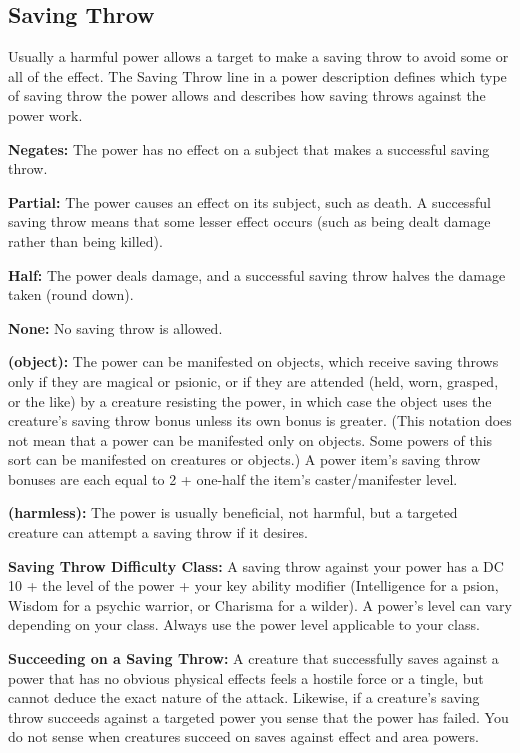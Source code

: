 \subsection{Saving Throw}
Usually a harmful power allows a target to make a saving throw to avoid some or all of the effect. The Saving Throw line in a power description defines which type of saving throw the power allows and describes how saving throws against the power work.

\textbf{Negates:} The power has no effect on a subject that makes a successful saving throw.

\textbf{Partial:} The power causes an effect on its subject, such as death. A successful saving throw means that some lesser effect occurs (such as being dealt damage rather than being killed).

\textbf{Half:} The power deals damage, and a successful saving throw halves the damage taken (round down).

\textbf{None:} No saving throw is allowed.

\textbf{(object):} The power can be manifested on objects, which receive saving throws only if they are magical or psionic, or if they are attended (held, worn, grasped, or the like) by a creature resisting the power, in which case the object uses the creature's saving throw bonus unless its own bonus is greater. (This notation does not mean that a power can be manifested only on objects. Some powers of this sort can be manifested on creatures or objects.) A power item's saving throw bonuses are each equal to 2 + one-half the item's caster/manifester level.

\textbf{(harmless):} The power is usually beneficial, not harmful, but a targeted creature can attempt a saving throw if it desires.

\textbf{Saving Throw Difficulty Class:} A saving throw against your power has a DC 10 + the level of the power + your key ability modifier (Intelligence for a psion, Wisdom for a psychic warrior, or Charisma for a wilder). A power's level can vary depending on your class. Always use the power level applicable to your class.

\textbf{Succeeding on a Saving Throw:} A creature that successfully saves against a power that has no obvious physical effects feels a hostile force or a tingle, but cannot deduce the exact nature of the attack. Likewise, if a creature's saving throw succeeds against a targeted power you sense that the power has failed. You do not sense when creatures succeed on saves against effect and area powers.

